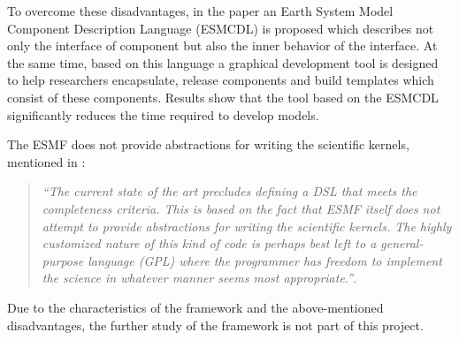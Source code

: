 \par
To overcome these disadvantages, in the paper \autocite{dsl:esmf-graphical} an Earth System Model Component Description Language (ESMCDL) is proposed which describes not only the interface of component but also the inner behavior of the interface. At the same time, based on this language a graphical development tool is designed to help researchers encapsulate, release components and build templates which consist of these components. Results show that the tool based on the ESMCDL significantly reduces the time required to develop models.
\par
The ESMF does not provide abstractions for writing the scientific kernels, mentioned in \autocite{dsl:esmf-coupling}:
\begin{quotation}
\textit{
``The current state of the art precludes defining a DSL that meets the completeness criteria. This is based on the fact that ESMF itself does not attempt to provide abstractions for writing the scientific kernels. The highly customized nature of this kind of code is perhaps best left to a general-purpose language (GPL) where the programmer has freedom to implement the science in whatever manner seems most appropriate.''}.
\end{quotation}
\par
Due to the characteristics of the framework and the above-mentioned disadvantages, the further study of the framework is not part of this project.
















